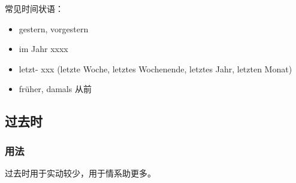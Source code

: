 常见时间状语：
\begin{itemize}
    \item gestern, vorgestern
    \item im Jahr xxxx
    \item letzt- xxx (letzte Woche, letztes Wochenende, letztes Jahr, letzten Monat)
    \item früher, damals 从前
\end{itemize}

\subsection{过去时}
\subsubsection{用法}
过去时用于实动较少，用于情系助更多。
